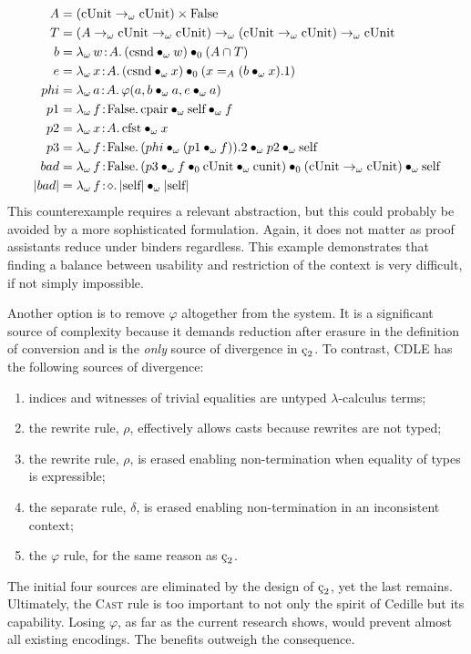 \begin{align*}
    A &= (\pUnit \to_\omega \pUnit) \times \pFalse \\
    T &= (A \to_\omega \pUnit \to_\omega \pUnit) \to_\omega (\pUnit \to_\omega \pUnit) \to_\omega \pUnit \\
    b &= \abs{\lambda_\omega}{w}{A}{
        \app{(\app{\psnd}{\omega}{w})}{0}{(A \cap T)}
    } \\
    e &= \abs{\lambda_\omega}{x}{A}{
        \app{(\app{\psnd}{\omega}{x})}{0}{(x =_A (\app{b}{\omega}{x}).1)}
    } \\
    phi &= \abs{\lambda_\omega}{a}{A}{\varphi(a, \app{b}{\omega}{a}, \app{e}{\omega}{a})} \\
    p1 &= \abs{\lambda_\omega}{f}{\pFalse}{\apptwo{\ppair}{\omega}{\pself}{\omega}{f}} \\
    p2 &= \abs{\lambda_\omega}{x}{A}{\app{\pfst}{\omega}{x}} \\
    p3 &= \abs{\lambda_\omega}{f}{\pFalse}{
        \apptwo{(\app{phi}{\omega}{(\app{p1}{\omega}{f})}).2}
            {\omega}{p2}
            {\omega}{\pself}
    } \\
    bad &= \abs{\lambda_\omega}{f}{\pFalse}{
        \apptwo{(\appthr{p3}{\omega}{f}{0}{\pUnit}{\omega}{\punit})}
            {0}{(\pUnit \to_\omega \pUnit)}
            {\omega}{\pself}
    } \\
    |bad| &= \abs{\lambda_\omega}{f}{\diamond}{\app{|\pself|}{\omega}{|\pself|}}
\end{align*}
This counterexample requires a relevant abstraction, but this could probably be avoided by a more sophisticated formulation.
Again, it does not matter as proof assistants reduce under binders regardless.
This example demonstrates that finding a balance between usability and restriction of the context is very difficult, if not simply impossible.

Another option is to remove $\varphi$ altogether from the system.
It is a significant source of complexity because it demands reduction after erasure in the definition of conversion and is the \textit{only} source of divergence in $\ced$.
To contrast, CDLE has the following sources of divergence:
\begin{enumerate}
    \item indices and witnesses of trivial equalities are untyped $\lambda$-calculus terms;
    \item the rewrite rule, $\rho$, effectively allows casts because rewrites are not typed;
    \item the rewrite rule, $\rho$, is erased enabling non-termination when equality of types is expressible;
    \item the separate rule, $\delta$, is erased enabling non-termination in an inconsistent context;
    \item the $\varphi$ rule, for the same reason as $\ced$.
\end{enumerate}
The initial four sources are eliminated by the design of $\ced$, yet the last remains.
Ultimately, the \textsc{Cast} rule is too important to not only the spirit of Cedille but its capability.
Losing $\varphi$, as far as the current research shows, would prevent almost all existing encodings.
The benefits outweigh the consequence.
